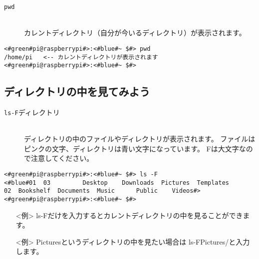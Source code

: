\begin{description}
\item[\texttt{pwd}]\mbox{}\\
 カレントディレクトリ（自分が今いるディレクトリ）が表示されます。
\end{description}

\begin{lstlisting}[caption=pwdコマンドの例,label=pwdtest]
<#green#pi@raspberrypi#>:<#blue#~ $#> pwd
/home/pi   <-- カレントディレクトリが表示されます
<#green#pi@raspberrypi#>:<#blue#~ $#>
\end{lstlisting}

\begin{tcolorbox}[title=\useOmetoi]
\begin{enumerate}
\end{enumerate}
\end{tcolorbox}


\subsection{ディレクトリの中を見てみよう}
\begin{description}
\item[\texttt{ls}\textvisiblespace \texttt{-F}\textvisiblespace ディレクトリ]\mbox{}\\
ディレクトリの中のファイルやディレクトリが表示されます。
ファイルはピンクの文字、ディレクトリは青い文字になっています。
Fは大文字なので注意してください。
\end{description}

\begin{minipage}{\linewidth}
\begin{lstlisting}[caption=ls -F コマンドの例。ファイルやディレクトリが表示されます,label=lsFtest]
<#green#pi@raspberrypi#>:<#blue#~ $#> ls -F
<#blue#01  03         Desktop    Downloads  Pictures  Templates
02  Bookshelf  Documents  Music      Public    Videos#>
<#green#pi@raspberrypi#>:<#blue#~ $#>
\end{lstlisting}
\end{minipage}

\begin{itemize}
\item[<例>] ls\textvisiblespace -Fだけを入力するとカレントディレクトリの中を見ることができます。 
\item[<例>] Picturesというディレクトリの中を見たい場合は ls\textvisiblespace -F\textvisiblespace Pictures/と入力します。 
\end{itemize}

